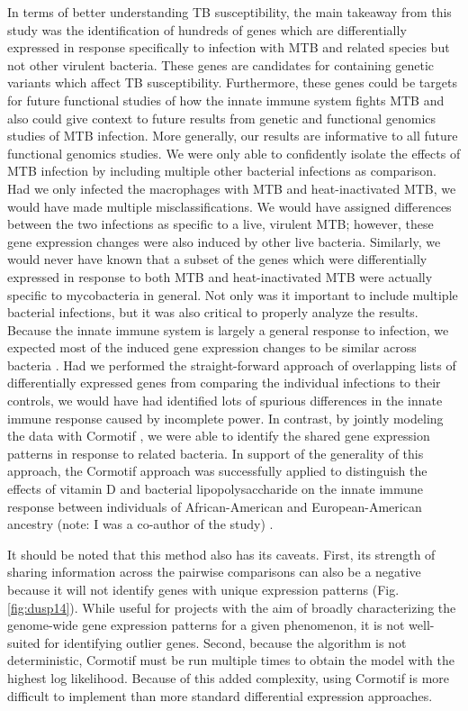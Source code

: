 In terms of better understanding TB susceptibility, the main takeaway from this
study was the identification of hundreds of genes which are differentially
expressed in response specifically to infection with MTB and related species but
not other virulent bacteria. These genes are candidates for containing genetic
variants which affect TB susceptibility. Furthermore, these genes could be
targets for future functional studies of how the innate immune system fights MTB
and also could give context to future results from genetic and functional
genomics studies of MTB infection. More generally, our results are informative
to all future functional genomics studies. We were only able to confidently
isolate the effects of MTB infection by including multiple other bacterial
infections as comparison. Had we only infected the macrophages with MTB and
heat-inactivated MTB, we would have made multiple misclassifications. We would
have assigned differences between the two infections as specific to a live,
virulent MTB; however, these gene expression changes were also induced by other
live bacteria. Similarly, we would never have known that a subset of the genes
which were differentially expressed in response to both MTB and heat-inactivated
MTB were actually specific to mycobacteria in general. Not only was it important
to include multiple bacterial infections, but it was also critical to properly
analyze the results. Because the innate immune system is largely a general
response to infection, we expected most of the induced gene expression changes
to be similar across bacteria \citep{Huang2001, Boldrick2002, Nau2002, Jenner2005}.
Had we performed the straight-forward approach of
overlapping lists of differentially expressed genes from comparing the
individual infections to their controls, we would have had identified lots of
spurious differences in the innate immune response caused by incomplete
power. In contrast, by jointly modeling the data with Cormotif \citep{Wei2015}, we were able to
identify the shared gene expression patterns in response to related bacteria. In
support of the generality of this approach, the Cormotif approach was
successfully applied to distinguish the effects of vitamin D and bacterial
lipopolysaccharide on the innate immune response between individuals of
African-American and European-American ancestry (note: I was a co-author of the
study) \citep{Kariuki2016}.

It should be noted that this method also has its caveats. First, its strength of
sharing information across the pairwise comparisons can also be a negative
because it will not identify genes with unique expression patterns (Fig. \ref{fig:dusp14}). While useful
for projects with the aim of broadly characterizing the genome-wide gene
expression patterns for a given phenomenon, it is not well-suited for
identifying outlier genes. Second, because the algorithm is not deterministic,
Cormotif must be run multiple times to obtain the model with the highest log
likelihood. Because of this added complexity, using Cormotif is more difficult
to implement than more standard differential expression approaches.

